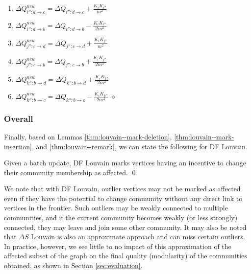\begin{enumerate}[start=23]
  \item $\Delta Q_{i'':d \rightarrow c}^{new} = \Delta Q_{i'':d \rightarrow c} + \frac{K_iK_{i''}}{m^2}$
  \item $\Delta Q_{i'':d \rightarrow b}^{new} = \Delta Q_{i'':d \rightarrow b} - \frac{K_iK_{i''}}{2m^2}$
  \item $\Delta Q_{j'':c \rightarrow d}^{new} = \Delta Q_{j'':c \rightarrow d} + \frac{K_iK_{j''}}{m^2}$
  \item $\Delta Q_{j'':c \rightarrow b}^{new} = \Delta Q_{j'':c \rightarrow b} + \frac{K_iK_{j''}}{2m^2}$
  \item $\Delta Q_{k'':b \rightarrow d}^{new} = \Delta Q_{k'':b \rightarrow d} + \frac{K_iK_{k''}}{2m^2}$
  \item $\Delta Q_{k'':b \rightarrow c}^{new} = \Delta Q_{k'':b \rightarrow c} - \frac{K_iK_{k''}}{2m^2}$ \hfill $\diamond$
\end{enumerate}




\subsubsection{Overall}

Finally, based on Lemmas \ref{thm:louvain--mark-deletion}, \ref{thm:louvain--mark-insertion}, and \ref{thm:louvain--remark}, we can state the following for DF Louvain.

\begin{theorem}
\label{thm:louvain}
Given a batch update, DF Louvain marks vertices having an incentive to change their community membership as affected. \qed
\end{theorem}

We note that with DF Louvain, outlier vertices may not be marked as affected even if they have the potential to change community without any direct link to vertices in the frontier. Such outliers may be weakly connected to multiple communities, and if the current community becomes weakly (or less strongly) connected, they may leave and join some other community. It may also be noted that $\Delta S$ Louvain is also an approximate approach and can miss certain outliers. In practice, however, we see little to no impact of this approximation of the affected subset of the graph on the final quality (modularity) of the communities obtained, as shown in Section \ref{sec:evaluation}.









